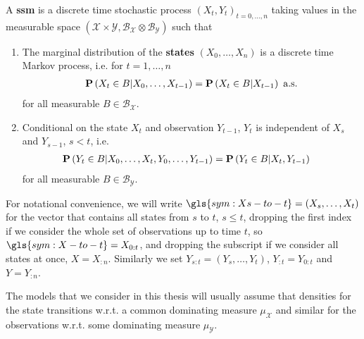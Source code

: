 \begin{definition}
    \label{def:ssm}
    A \textbf{\acrlong{ssm}} is a discrete time stochastic process $(X_t, Y_t)_{t=0, \dots, n}$ taking values in the measurable space $\left(\mathcal X \times \mathcal Y, \mathcal B_{\mathcal X} \otimes \mathcal B_{\mathcal Y}\right)$ such that
    \begin{enumerate}
        \item The marginal distribution of the \textbf{states} $(X_0, \dots, X_{n})$ is a discrete time Markov process, i.e. for $t = 1, \dots, n$
              \begin{align}
                  \label{eq:markov_property}
                  \P \left( X_{t} \in B \middle| X_0, \dots, X_{t - 1} \right) = \P \left( X_{t} \in B \middle| X_{t - 1} \right) \text{ a.s.}
              \end{align}
              for all measurable $B \in \mathcal B_{\mathcal X}$.
        \item Conditional on the state $X_t$ and observation $Y_{t - 1}$, $Y_t$ is independent of $X_s$ and $Y_{s - 1}$, $s < t$, i.e.
              \begin{align*}
                  \P \left( Y_{t} \in B \middle| X_{0}, \dots, X_{t}, Y_{0}, \dots, Y_{t - 1} \right) & = \P \left( Y_{t} \in B | X_{t}, Y_{t - 1} \right)
              \end{align*}
              for all measurable $B \in \mathcal B _{\mathcal Y}$.
    \end{enumerate}
\end{definition}

For notational convenience, we will write $\gls{sym:Xs-to-t} = \left(X_s, \dots, X_{t}\right)$ for the vector that contains all states from $s$ to $t$, $s \leq t$, dropping the first index if we consider the whole set of observations up to time $t$, so $\gls{sym:X-to-t} = X_{0:t}$, and dropping the subscript if we consider all states at once, $X = X_{:n}$.
Similarly we set $Y_{s:t} = \left(Y_s, \dots, Y_{t}\right)$, $Y_{:t} = Y_{0:t}$ and $Y = Y_{:n}$.

The models that we consider in this thesis will usually assume that densities for the state transitions w.r.t. a common dominating measure $\mu_{\mathcal X}$ and similar for the observations w.r.t. some dominating measure $\mu_{\mathcal Y}$. 

